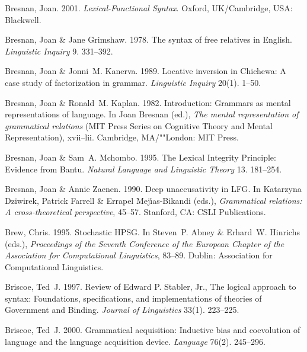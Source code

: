 \begin{thebibliography}{1420}
Bresnan, Joan. 2001.
\newblock \emph{{Lexical-Functional Syntax}}.
\newblock Oxford, UK/Cambridge, USA: Blackwell.

Bresnan, Joan \& Jane Grimshaw. 1978.
\newblock The syntax of free relatives in {English}.
\newblock \emph{Linguistic Inquiry} 9. 331--392.

Bresnan, Joan \& Jonni~M. Kanerva. 1989.
\newblock Locative inversion in {Chichewa}: {A} case study of factorization in
  grammar.
\newblock \emph{Linguistic Inquiry} 20(1). 1--50.

Bresnan, Joan \& Ronald~M. Kaplan. 1982.
\newblock Introduction: Grammars as mental representations of language.
\newblock In Joan Bresnan (ed.), \emph{The mental representation of grammatical
  relations}  (MIT Press Series on Cognitive Theory and Mental Representation),
  xvii--lii. Cambridge, MA/""London: MIT Press.

Bresnan, Joan \& Sam~A. Mchombo. 1995.
\newblock The {Lexical Integrity Principle}: {Evidence} from {Bantu}.
\newblock \emph{Natural Language and Linguistic Theory} 13. 181--254.

Bresnan, Joan \& Annie Zaenen. 1990.
\newblock Deep unaccusativity in {LFG}.
\newblock In Katarzyna Dziwirek, Patrick Farrell \& Errapel Mej\'{\i}as-Bikandi
  (eds.), \emph{Grammatical relations: {A} cross-theoretical perspective},
  45--57. Stanford, CA: CSLI Publications.

Brew, Chris. 1995.
\newblock Stochastic {HPSG}.
\newblock In Steven~P. Abney \& Erhard~W. Hinrichs (eds.), \emph{Proceedings of
  the {Seventh Conference of the European Chapter of the Association for
  Computational Linguistics}}, 83--89. Dublin: Association for Computational
  Linguistics.

Briscoe, Ted~J. 1997.
\newblock Review of {Edward P. Stabler, Jr.}, {The} logical approach to syntax:
  {Foundations}, specifications, and implementations of theories of {Government
  and Binding}.
\newblock \emph{Journal of Linguistics} 33(1). 223--225.

Briscoe, Ted~J. 2000.
\newblock Grammatical acquisition: Inductive bias and coevolution of language
  and the language acquisition device.
\newblock \emph{Language} 76(2). 245--296.


\end{thebibliography}
